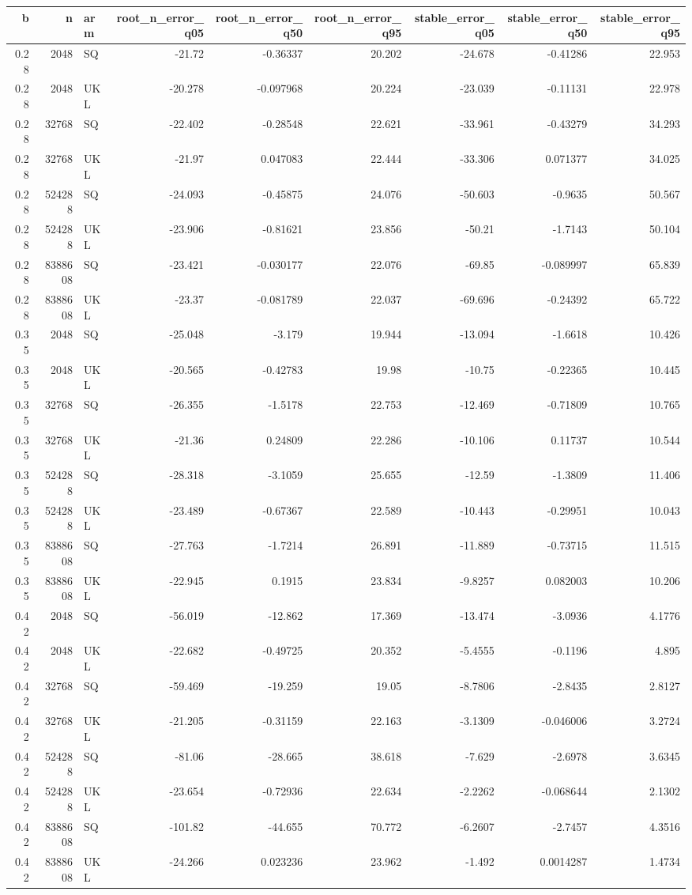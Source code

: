 \begin{tabular}{rrlrrrrrr}
\toprule
b & n & arm & root_n_error_q05 & root_n_error_q50 & root_n_error_q95 & stable_error_q05 & stable_error_q50 & stable_error_q95 \\
\midrule
0.28 & 2048 & SQ & -21.72 & -0.36337 & 20.202 & -24.678 & -0.41286 & 22.953 \\
0.28 & 2048 & UKL & -20.278 & -0.097968 & 20.224 & -23.039 & -0.11131 & 22.978 \\
0.28 & 32768 & SQ & -22.402 & -0.28548 & 22.621 & -33.961 & -0.43279 & 34.293 \\
0.28 & 32768 & UKL & -21.97 & 0.047083 & 22.444 & -33.306 & 0.071377 & 34.025 \\
0.28 & 524288 & SQ & -24.093 & -0.45875 & 24.076 & -50.603 & -0.9635 & 50.567 \\
0.28 & 524288 & UKL & -23.906 & -0.81621 & 23.856 & -50.21 & -1.7143 & 50.104 \\
0.28 & 8388608 & SQ & -23.421 & -0.030177 & 22.076 & -69.85 & -0.089997 & 65.839 \\
0.28 & 8388608 & UKL & -23.37 & -0.081789 & 22.037 & -69.696 & -0.24392 & 65.722 \\
0.35 & 2048 & SQ & -25.048 & -3.179 & 19.944 & -13.094 & -1.6618 & 10.426 \\
0.35 & 2048 & UKL & -20.565 & -0.42783 & 19.98 & -10.75 & -0.22365 & 10.445 \\
0.35 & 32768 & SQ & -26.355 & -1.5178 & 22.753 & -12.469 & -0.71809 & 10.765 \\
0.35 & 32768 & UKL & -21.36 & 0.24809 & 22.286 & -10.106 & 0.11737 & 10.544 \\
0.35 & 524288 & SQ & -28.318 & -3.1059 & 25.655 & -12.59 & -1.3809 & 11.406 \\
0.35 & 524288 & UKL & -23.489 & -0.67367 & 22.589 & -10.443 & -0.29951 & 10.043 \\
0.35 & 8388608 & SQ & -27.763 & -1.7214 & 26.891 & -11.889 & -0.73715 & 11.515 \\
0.35 & 8388608 & UKL & -22.945 & 0.1915 & 23.834 & -9.8257 & 0.082003 & 10.206 \\
0.42 & 2048 & SQ & -56.019 & -12.862 & 17.369 & -13.474 & -3.0936 & 4.1776 \\
0.42 & 2048 & UKL & -22.682 & -0.49725 & 20.352 & -5.4555 & -0.1196 & 4.895 \\
0.42 & 32768 & SQ & -59.469 & -19.259 & 19.05 & -8.7806 & -2.8435 & 2.8127 \\
0.42 & 32768 & UKL & -21.205 & -0.31159 & 22.163 & -3.1309 & -0.046006 & 3.2724 \\
0.42 & 524288 & SQ & -81.06 & -28.665 & 38.618 & -7.629 & -2.6978 & 3.6345 \\
0.42 & 524288 & UKL & -23.654 & -0.72936 & 22.634 & -2.2262 & -0.068644 & 2.1302 \\
0.42 & 8388608 & SQ & -101.82 & -44.655 & 70.772 & -6.2607 & -2.7457 & 4.3516 \\
0.42 & 8388608 & UKL & -24.266 & 0.023236 & 23.962 & -1.492 & 0.0014287 & 1.4734 \\
\bottomrule
\end{tabular}
